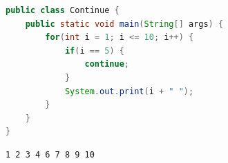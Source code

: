 \vspace{0.5cm}


\begin{lstlisting}[language=Java]
public class Continue {
    public static void main(String[] args) {
        for(int i = 1; i <= 10; i++) {
            if(i == 5) {
                continue;
            }
            System.out.print(i + " ");
        }
    }
}
\end{lstlisting}

\begin{tcolorbox}
\begin{verbatim}
1 2 3 4 6 7 8 9 10
\end{verbatim}
\end{tcolorbox}

\newpage